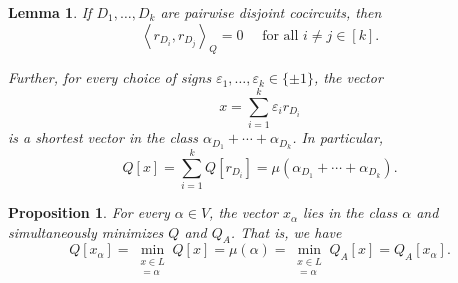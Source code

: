 \documentclass[10pt,a4paper]{amsart}
\newtheorem{proposition}{Proposition}
\newtheorem{lemma}{Lemma}
\newcommand{\angles}[2]{\left\langle #1,#2\right\rangle_Q}
\begin{document}
\begin{lemma}\label{lem:orthogonal}
If $D_1,\ldots,D_k$ are pairwise disjoint cocircuits, then
\[
  \angles{r_{D_i}}{r_{D_j}}=0 \quad \text{ for all } i \neq j \in [k].
\]


Further, for every choice of signs
$\varepsilon_1,\ldots,\varepsilon_k\in\{\pm1\}$, the vector
\[
    x=\sum_{i=1}^k \varepsilon_i r_{D_i}
\]
is a shortest vector in the class $\alpha_{D_1}+\cdots+\alpha_{D_k}$. In particular,
\[
    Q[x]
    =
    \sum_{i=1}^k Q[r_{D_i}]
    =
    \mu\left(\alpha_{D_1}+\cdots+\alpha_{D_k}\right).
\]
\end{lemma}

\begin{proposition}\label{prop:common-representative}
For every $\alpha\in V$, the vector $x_\alpha$ lies in the class $\alpha$ and simultaneously minimizes $Q$ and
$Q_A$. That is, we have
\[
    Q[x_\alpha]
    =
    \min_{\substack{x\in L\\ [x]=\alpha}}Q[x]
    =
    \mu(\alpha)
    =
    \min_{\substack{x\in L\\ [x]=\alpha}}Q_A[x]
    =
    Q_A[x_\alpha].
\]
\end{proposition}
\end{document}
